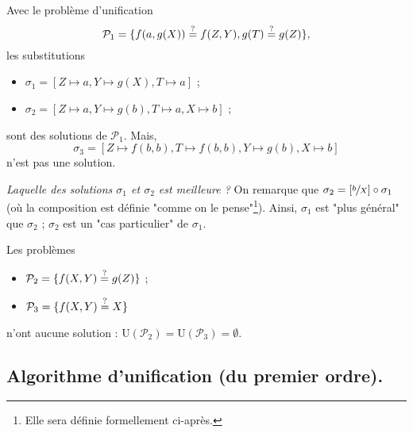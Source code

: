 \documentclass[../main]{subfiles}
\begin{document}
  \begin{exm}
    Avec le problème d'unification \[
    \mathcal{P}_1 = \{f(a,g(X)) \mathrel{\overset ? =} f(Z, Y), g(T) \mathrel{\overset ? =} g(Z) \} 
    ,\]
    les substitutions 
    \begin{itemize}
      \item $\sigma_1 = [Z \mapsto a, Y \mapsto g(X), T \mapsto a]$ ;
      \item $\sigma_2 = [Z \mapsto a, Y \mapsto g(b), T\mapsto a, X \mapsto b]$ ;
    \end{itemize}
    sont des solutions de $\mathcal{P}_1$. Mais, \[
      \sigma_3 = [Z \mapsto f(b,b), T \mapsto f(b,b), Y \mapsto g(b), X \mapsto b]
    \] n'est pas une solution.

    \textsl{Laquelle des solutions $\sigma_1$ et $\sigma_2$ est meilleure ?}
    On remarque que $\sigma_2 = [\sfrac{b}{X}] \circ \sigma_1$ (où la composition est définie "comme on le pense"\footnote{Elle sera définie formellement ci-après.}).
    Ainsi, $\sigma_1$ est "plus général" que $\sigma_2$ ; $\sigma_2$ est un "cas particulier" de $\sigma_1$.
  \end{exm}

  \begin{exm}
    Les problèmes 
    \begin{itemize}
      \item $\mathcal{P}_2 = \{f(X,Y) \mathrel{\overset ? =} g(Z)\}$ ;
      \item $\mathcal{P}_3 = \{f(X,Y) \mathrel{\overset ? =} X\}$
    \end{itemize}
    n'ont aucune solution : $\mathrm{U}(\mathcal{P}_2) = \mathrm{U}(\mathcal{P}_3) = \emptyset$.
  \end{exm}

  \subsection{Algorithme d'unification (du premier ordre).}
\end{document}
